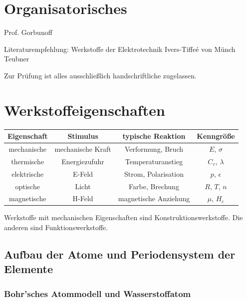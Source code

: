 \section{Organisatorisches}

Prof. Gorbunoff

Literaturempfehlung: Werkstoffe der Elektrotechnik Ivers-Tiffeé von Münch Teubner

Zur Prüfung ist alles ausschließlich handschriftliche zugelassen.

\section{Werkstoffeigenschaften}

\begin{tabular}{c c c c}
	Eigenschaft & Stimulus & typische Reaktion & Kenngröße \\
	\hline
	mechanische & mechanische Kraft & Verformung, Bruch & $E$, $\sigma$ \\
	thermische & Energiezufuhr & Temperaturanstieg & $C_v$, $\lambda$ \\
	elektrische & E-Feld & Strom, Polarisation & $p$, $\epsilon$ \\
	optische & Licht & Farbe, Brechung & $R$, $T$, $n$ \\
	magnetische & H-Feld & magnetische Anziehung & $\mu$, $H_c$\\
\end{tabular}

Werkstoffe mit mechanischen Eigenschaften sind Konstruktionswerkstoffe. Die anderen sind Funktionswerkstoffe.

\subsection{Aufbau der Atome und Periodensystem der Elemente}

\subsubsection{Bohr'sches Atommodell und Wasserstoffatom}

